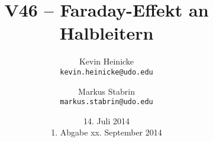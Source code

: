 



\title{%
    V46 -- Faraday-Effekt an Halbleitern
}
\author{%
    Kevin Heinicke\\
    \texttt{kevin.heinicke@udo.edu}
    \and
    Markus Stabrin\\
    \texttt{markus.stabrin@udo.edu}
}
\date{%
    14. Juli 2014\\
    {\small 1. Abgabe} xx. September 2014
}

    \maketitle%
    \tableofcontents
    \newpage

    

    \printbibliography

